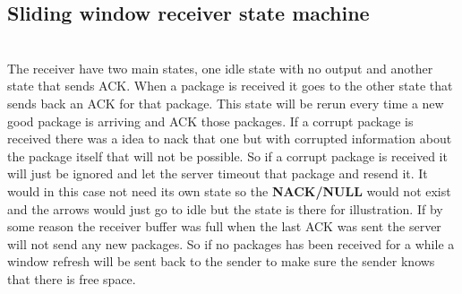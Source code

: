 \documentclass[conference]{IEEEtran}
\begin{document}
\subsection{Sliding window receiver state machine}

\\The receiver have two main states, one idle state with no output and another state that sends ACK. When a package is received it goes to the other state that sends back an ACK for that package. This state will be rerun every time a new good package is arriving and ACK those packages. If a corrupt package is received there was a idea to nack that one but with corrupted information about the package itself that will not be possible. So if a corrupt package is received it will just be ignored and let the server timeout that package and resend it. It would in this case not need its own state so the \textbf{NACK/NULL} would not exist and the arrows would just go to idle but the state is there for illustration. If by some reason the receiver buffer was full when the last ACK was sent the server will not send any new packages. So if no packages has been received for a while a window refresh will be sent back to the sender to make sure the sender knows that there is free space. 

\end{document}

